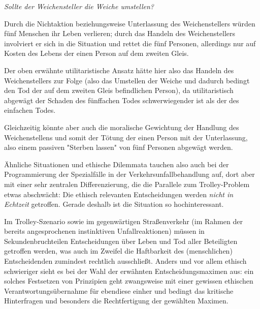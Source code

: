 \documentclass[twocolumn, german]{tum-article}
\begin{document}
\emph{Sollte der Weichensteller die Weiche umstellen?}

Durch die Nichtaktion beziehungsweise Unterlassung des Weichenstellers würden fünf Menschen ihr Leben verlieren; durch das Handeln des Weichenstellers involviert er sich in die Situation und rettet die fünf Personen, allerdings nur auf Kosten des Lebens der einen Person auf dem zweiten Gleis.

Der oben erwähnte utilitaristische Ansatz hätte hier also das Handeln des Weichenstellers zur Folge (also das Umstellen der Weiche und dadurch bedingt den Tod der auf dem zweiten Gleis befindlichen Person), da utilitaristisch abgewägt der Schaden des fünffachen Todes schwerwiegender ist als der des einfachen Todes.

Gleichzeitig könnte aber auch die moralische Gewichtung der Handlung des Weichenstellens und somit der Tötung der einen Person mit der Unterlassung, also einem passiven "Sterben lassen" von fünf Personen abgewägt werden.

Ähnliche Situationen und ethische Dilemmata tauchen also auch bei der Programmierung der Spezialfälle in der Verkehrsunfallbehandlung auf, dort aber mit einer sehr zentralen Differenzierung, die die Parallele zum Trolley-Problem etwas abschwächt:
Die ethisch relevanten Entscheidungen werden \textit{nicht in Echtzeit} getroffen. Gerade deshalb ist die Situation so hochinteressant.

Im Trolley-Szenario sowie im gegenwärtigen Straßenverkehr (im Rahmen der bereits angesprochenen instinktiven Unfallreaktionen) müssen in Sekundenbruchteilen Entscheidungen über Leben und Tod aller Beteiligten getroffen werden, was auch im Zweifel die Haftbarkeit des (menschlichen) Entscheidenden zumindest rechtlich ausschließt.
Anders und vor allem ethisch schwieriger sieht es bei der Wahl der erwähnten Entscheidungsmaximen aus: ein solches Festsetzen von Prinzipien geht zwangsweise mit einer gewissen ethischen Verantwortungsübernahme für ebendiese einher und bedingt das kritische Hinterfragen und besonders die Rechtfertigung der gewählten Maximen.
\end{document}
